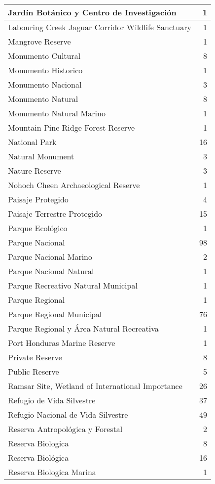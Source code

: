 \documentclass[
]{book}
\begin{document}
\begin{table}
\begin{tabular}[t]{l|r}
\hline
Jardín Botánico y Centro de Investigación & 1\\
\hline
Labouring Creek Jaguar Corridor Wildlife Sanctuary & 1\\
\hline
Mangrove Reserve & 1\\
\hline
Monumento Cultural & 8\\
\hline
Monumento Historico & 1\\
\hline
Monumento Nacional & 3\\
\hline
Monumento Natural & 8\\
\hline
Monumento Natural Marino & 1\\
\hline
Mountain Pine Ridge Forest Reserve & 1\\
\hline
National Park & 16\\
\hline
Natural Monument & 3\\
\hline
Nature Reserve & 3\\
\hline
Nohoch Cheen Archaeological Reserve & 1\\
\hline
Paisaje Protegido & 4\\
\hline
Paisaje Terrestre Protegido & 15\\
\hline
Parque Ecológico & 1\\
\hline
Parque Nacional & 98\\
\hline
Parque Nacional Marino & 2\\
\hline
Parque Nacional Natural & 1\\
\hline
Parque Recreativo Natural Municipal & 1\\
\hline
Parque Regional & 1\\
\hline
Parque Regional Municipal & 76\\
\hline
Parque Regional y Área Natural Recreativa & 1\\
\hline
Port Honduras Marine Reserve & 1\\
\hline
Private Reserve & 8\\
\hline
Public Reserve & 5\\
\hline
Ramsar Site, Wetland of International Importance & 26\\
\hline
Refugio de Vida Silvestre & 37\\
\hline
Refugio Nacional de Vida Silvestre & 49\\
\hline
Reserva Antropológica y Forestal & 2\\
\hline
Reserva Biologica & 8\\
\hline
Reserva Biológica & 16\\
\hline
Reserva Biologica Marina & 1\\
\hline

\end{tabular}
\end{table}
\end{document}
